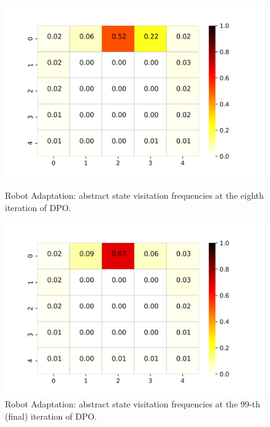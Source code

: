 \begin{figure}[h!]
	\centering
	\begin{minipage}[t]{.45\columnwidth}
		\includegraphics[width=\textwidth]{plots/colormap8.png}
		\caption{Robot Adaptation: abstract state visitation frequencies at the eighth iteration of \ac{DPO}.}
		\label{fig:cm8}
	\end{minipage}%
	\hfill
	\begin{minipage}[t]{.45\columnwidth}
		\includegraphics[width=\textwidth]{plots/colormap99.png}
		\caption{Robot Adaptation: abstract state visitation frequencies at the $99$-th (final) iteration of \ac{DPO}.}
		\label{fig:cm99}
	\end{minipage}
\end{figure}


